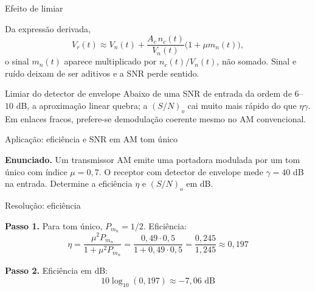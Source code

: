 
\begin{frame}{Efeito de limiar}

Da expressão derivada,
\[
V_r(t) \approx V_n(t) + \frac{A_c\, n_c(t)}{V_n(t)}\bigl(1 + \mu m_n(t)\bigr),
\]
o sinal $m_n(t)$ aparece multiplicado por $n_c(t)/V_n(t)$, não somado. Sinal e ruído deixam de ser aditivos e a SNR perde sentido.

\vspace{0.2cm}

\begin{block}{Limiar do detector de envelope}
Abaixo de uma SNR de entrada da ordem de $6$--$10$ dB, a aproximação linear quebra; a $(S/N)_o$ cai muito mais rápido do que $\eta\gamma$. Em enlaces fracos, prefere-se demodulação coerente mesmo no AM convencional.
\end{block}

\end{frame}


\begin{frame}{Aplicação: eficiência e SNR em AM tom único}

\textbf{Enunciado.} Um transmissor AM emite uma portadora modulada por um tom único com índice $\mu = 0{,}7$. O receptor com detector de envelope mede $\gamma = 40$ dB na entrada. Determine a eficiência $\eta$ e $(S/N)_o$ em dB.

\begin{center}
\end{center}

\end{frame}


\begin{frame}{Resolução: eficiência}

\textbf{Passo 1.} Para tom único, $P_{m_n} = 1/2$. Eficiência:
\[
\eta = \frac{\mu^2 P_{m_n}}{1 + \mu^2 P_{m_n}} = \frac{0{,}49 \cdot 0{,}5}{1 + 0{,}49 \cdot 0{,}5} = \frac{0{,}245}{1{,}245} \approx 0{,}197
\]

\textbf{Passo 2.} Eficiência em dB:
\[
10\log_{10}(0{,}197) \approx -7{,}06 \text{ dB}
\]

\end{frame}

